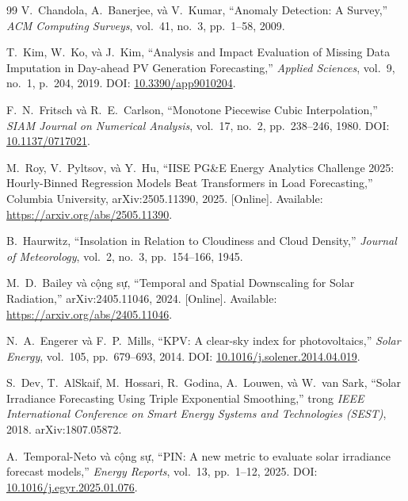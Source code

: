 \documentclass[12pt, a4paper]{report}
\begin{document}
\begin{thebibliography}{99}
V.~Chandola, A.~Banerjee, và V.~Kumar,
\newblock ``Anomaly Detection: A Survey,''
\newblock \textit{ACM Computing Surveys}, vol.~41, no.~3, pp.~1--58, 2009.

T.~Kim, W.~Ko, và J.~Kim,
\newblock ``Analysis and Impact Evaluation of Missing Data Imputation in Day-ahead PV Generation Forecasting,''
\newblock \textit{Applied Sciences}, vol.~9, no.~1, p.~204, 2019.
\newblock DOI: \href{https://doi.org/10.3390/app9010204}{10.3390/app9010204}.

F.~N.~Fritsch và R.~E.~Carlson,
\newblock ``Monotone Piecewise Cubic Interpolation,''
\newblock \textit{SIAM Journal on Numerical Analysis}, vol.~17, no.~2, pp.~238--246, 1980.
\newblock DOI: \href{https://doi.org/10.1137/0717021}{10.1137/0717021}.

M.~Roy, V.~Pyltsov, và Y.~Hu,
\newblock ``IISE PG\&E Energy Analytics Challenge 2025: Hourly-Binned Regression Models Beat Transformers in Load Forecasting,''
\newblock Columbia University, arXiv:2505.11390, 2025. [Online]. Available: \url{https://arxiv.org/abs/2505.11390}.

B.~Haurwitz,
\newblock ``Insolation in Relation to Cloudiness and Cloud Density,''
\newblock \textit{Journal of Meteorology}, vol.~2, no.~3, pp.~154--166, 1945.

M.~D.~Bailey và cộng sự,
\newblock ``Temporal and Spatial Downscaling for Solar Radiation,''
\newblock arXiv:2405.11046, 2024. [Online]. Available: \url{https://arxiv.org/abs/2405.11046}.

N.~A.~Engerer và F.~P.~Mills,
\newblock ``KPV: A clear-sky index for photovoltaics,''
\newblock \textit{Solar Energy}, vol.~105, pp.~679--693, 2014.
\newblock DOI: \href{https://doi.org/10.1016/j.solener.2014.04.019}{10.1016/j.solener.2014.04.019}.

S.~Dev, T.~AlSkaif, M.~Hossari, R.~Godina, A.~Louwen, và W.~van Sark,
\newblock ``Solar Irradiance Forecasting Using Triple Exponential Smoothing,''
\newblock trong \textit{IEEE International Conference on Smart Energy Systems and Technologies (SEST)}, 2018.
\newblock arXiv:1807.05872.

A.~Temporal-Neto và cộng sự,
\newblock ``PIN: A new metric to evaluate solar irradiance forecast models,''
\newblock \textit{Energy Reports}, vol.~13, pp.~1--12, 2025.
\newblock DOI: \href{https://doi.org/10.1016/j.egyr.2025.01.076}{10.1016/j.egyr.2025.01.076}.


\end{thebibliography}
\end{document}
